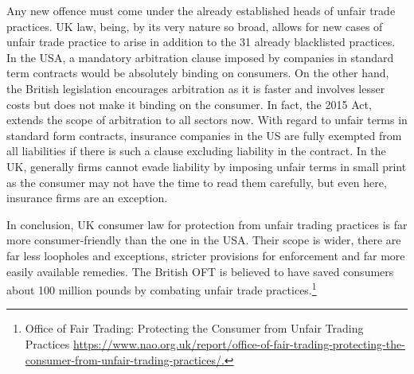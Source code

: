 \begin{multicols}{2}
\noi
Any new offence must come under the already established heads of unfair trade practices. UK
law, being, by its very nature so broad, allows for new cases of unfair trade practice to arise in
addition to the 31 already blacklisted practices. In the USA, a mandatory arbitration clause
imposed by companies in standard term contracts would be absolutely binding on consumers.
On the other hand, the British legislation encourages arbitration as it is faster and involves
lesser costs but does not make it binding on the consumer. In fact, the 2015 Act, extends the
scope of arbitration to all sectors now. With regard to unfair terms in standard form contracts,
insurance companies in the US are fully exempted from all liabilities if there is such a clause
excluding liability in the contract. In the UK, generally firms cannot evade liability by imposing
unfair terms in small print as the consumer may not have the time to read them carefully, but
even here, insurance firms are an exception.

\noi
In conclusion, UK consumer law for protection from unfair trading practices is far more
consumer-friendly than the one in the USA. Their scope is wider, there are far less loopholes
and exceptions, stricter provisions for enforcement and far more easily available remedies. The
British OFT is believed to have saved consumers about 100 million pounds by combating
unfair trade practices.\footnote{Office of Fair Trading: Protecting the Consumer from Unfair Trading Practices  \url{https://www.nao.org.uk/report/office-of-fair-trading-protecting-the-consumer-from-unfair-trading-practices/.}}

\vspace{.1cm}


\vspace{.1cm}


\end{multicols}

